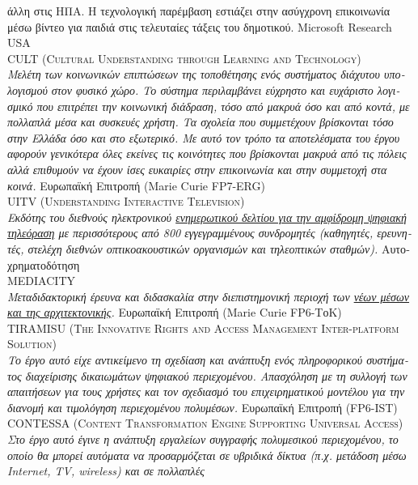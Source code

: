 \documentclass[11pt, a4paper]{article}
\newcommand{\note}[1]{\marginnote{\scriptsize #1}}
\begin{document}
\begin{greek}
{άλλη στις ΗΠΑ. Η τεχνολογική παρέμβαση εστιάζει στην ασύγχρονη
επικοινωνία μέσω βίντεο για παιδιά στις τελευταίες τάξεις του
δημοτικού.} Microsoft Research USA\\[.2cm]
\note{2009--2011}\textsc{CULT (Cultural Understanding through Learning
and Technology)}\\
\emph{Μελέτη των κοινωνικών επιπτώσεων της τοποθέτησης ενός συστήματος
διάχυτου υπολογισμού στον φυσικό χώρο. Το σύστημα περιλαμβάνει εύχρηστο
και ευχάριστο λογισμικό που επιτρέπει την κοινωνική διάδραση, τόσο από
μακρυά όσο και από κοντά, με πολλαπλά μέσα και συσκευές χρήστη. Τα
σχολεία που συμμετέχουν βρίσκονται τόσο στην Ελλάδα όσο και στο
εξωτερικό. Με αυτό τον τρόπο τα αποτελέσματα του έργου αφορούν
γενικότερα όλες εκείνες τις κοινότητες που βρίσκονται μακρυά από τις
πόλεις αλλά επιθυμούν να έχουν ίσες ευκαιρίες στην επικοινωνία και στην
συμμετοχή στα κοινά.} Ευρωπαϊκή Επιτροπή (Marie Curie FP7-ERG)\\[.2cm]
\note{2002--2010}\textsc{UITV (Understanding Interactive Television)}\\
\emph{Εκδότης του διεθνούς ηλεκτρονικού
\href{https://www.freelists.org/archive/uitv/}{ενημερωτικού δελτίου για
την αμφίδρομη ψηφιακή τηλεόραση} με περισσότερους από 800 εγγεγραμμένους
συνδρομητές (καθηγητές, ερευνητές, στελέχη διεθνών οπτικοακουστικών
οργανισμών και τηλεοπτικών σταθμών).} Αυτοχρηματοδότηση\\[.2cm]
\note{2006--2008}\textsc{MEDIACITY}\\
\emph{Μεταδιδακτορική έρευνα και διδασκαλία στην διεπιστημονική περιοχή
των \href{http://www.uni-weimar.de/mediaarchitecture}{νέων μέσων και της
αρχιτεκτονικής}.} Ευρωπαϊκή Επιτροπή (Marie Curie FP6-ΤοΚ)\\[.2cm]
\note{2004--2005}\textsc{TIRAMISU (The Innovative Rights and Access
Management Inter-platform Solution)}\\
\emph{Το έργο αυτό είχε αντικείμενο τη σχεδίαση και ανάπτυξη ενός
πληροφορικού συστήματος διαχείρισης δικαιωμάτων ψηφιακού περιεχομένου.
Απασχόληση με τη συλλογή των απαιτήσεων για τους χρήστες και τον
σχεδιασμό του επιχειρηματικού μοντέλου για την διανομή και τιμολόγηση
περιεχομένου πολυμέσων.} Ευρωπαϊκή Επιτροπή (FP6-IST)\\[.2cm]
\note{2001--2003}\textsc{CONTESSA (Content Transformation Engine
Supporting Universal Access)}\\
\emph{Στο έργο αυτό έγινε η ανάπτυξη εργαλείων συγγραφής πολυμεσικού
περιεχομένου, το οποίο θα μπορεί αυτόματα να προσαρμόζεται σε υβριδικά
δίκτυα (π.χ. μετάδοση μέσω Internet, TV, wireless) και σε πολλαπλές
}
\end{greek}
\end{document}
